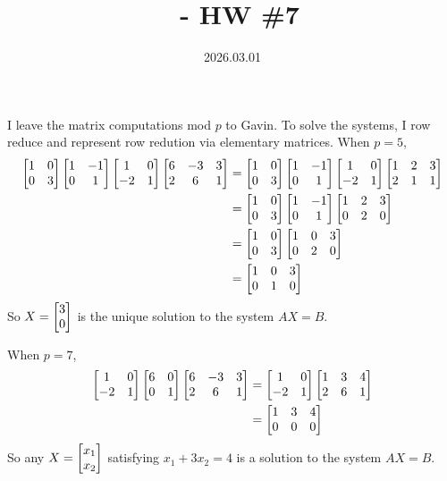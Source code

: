 \documentclass[12pt]{article}
\title{\course\ - HW \#7}
\author{\myname}
\date{2026.03.01}
\begin{document}
\maketitle
\thispagestyle{fancy}


\section{} 
\subsection{}
I leave the matrix computations mod $p$ to Gavin. 
To solve the systems, I row reduce and represent row redution via elementary matrices. 
When $p = 5$, 
\begin{align*}
  \begin{bmatrix}1 & 0 \\ 0 & 3\end{bmatrix} \begin{bmatrix}1 & -1 \\ 0 & 1\end{bmatrix} \begin{bmatrix}1 & 0 \\ -2 & 1\end{bmatrix} \begin{bmatrix}6 & -3 & 3 \\ 2 & 6 & 1\end{bmatrix} & = \begin{bmatrix}1 & 0 \\ 0 & 3\end{bmatrix} \begin{bmatrix}1 & -1 \\ 0 & 1\end{bmatrix} \begin{bmatrix}1 & 0 \\ -2 & 1\end{bmatrix} \begin{bmatrix}1 & 2 & 3 \\ 2 & 1 & 1\end{bmatrix} \\ 
          & = \begin{bmatrix}1 & 0 \\ 0 & 3\end{bmatrix} \begin{bmatrix}1 & -1 \\ 0 & 1\end{bmatrix} \begin{bmatrix}1 & 2 & 3 \\ 0 & 2 & 0\end{bmatrix} \\ 
          & = \begin{bmatrix}1 & 0 \\ 0 & 3\end{bmatrix} \begin{bmatrix}1 & 0 & 3 \\ 0 & 2 & 0\end{bmatrix} \\ 
          & = \begin{bmatrix}1 & 0 & 3 \\ 0 & 1 & 0\end{bmatrix}
\end{align*}
So $X = \begin{bmatrix}3 \\ 0\end{bmatrix}$ is the unique solution to the system $AX = B$. 

When $p = 7$, 
\begin{align*}
  \begin{bmatrix}1 & 0 \\ -2 & 1\end{bmatrix} \begin{bmatrix}6 & 0 \\ 0 & 1\end{bmatrix} \begin{bmatrix}6 & -3 & 3 \\ 2 & 6 & 1\end{bmatrix} & = \begin{bmatrix}1 & 0 \\ -2 & 1\end{bmatrix} \begin{bmatrix}1 & 3 & 4 \\ 2 & 6 & 1\end{bmatrix} \\ 
          & = \begin{bmatrix}1 & 3 & 4 \\ 0 & 0 & 0\end{bmatrix}
\end{align*}
So any $X = \begin{bmatrix}x_1 \\ x_2\end{bmatrix}$ satisfying $x_1 + 3x_2 = 4$ is a solution to the system $AX = B$. 
\end{document}
